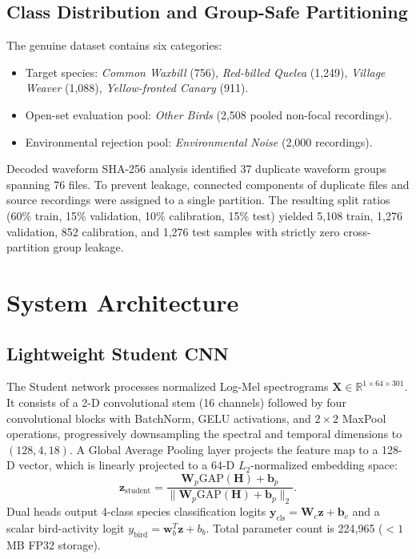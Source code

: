 \documentclass[11pt,a4paper]{article}
\begin{document}
\subsection{Class Distribution and Group-Safe Partitioning}
The genuine dataset contains six categories:
\begin{itemize}
    \item Target species: \textit{Common Waxbill} (756), \textit{Red-billed Quelea} (1,249), \textit{Village Weaver} (1,088), \textit{Yellow-fronted Canary} (911).
    \item Open-set evaluation pool: \textit{Other Birds} (2,508 pooled non-focal recordings).
    \item Environmental rejection pool: \textit{Environmental Noise} (2,000 recordings).
\end{itemize}
Decoded waveform SHA-256 analysis identified 37 duplicate waveform groups spanning 76 files. To prevent leakage, connected components of duplicate files and source recordings were assigned to a single partition. The resulting split ratios (60\% train, 15\% validation, 10\% calibration, 15\% test) yielded 5,108 train, 1,276 validation, 852 calibration, and 1,276 test samples with strictly zero cross-partition group leakage.

\section{System Architecture}
\subsection{Lightweight Student CNN}
The Student network processes normalized Log-Mel spectrograms $\mathbf{X} \in \mathbb{R}^{1 \times 64 \times 301}$. It consists of a 2-D convolutional stem (16 channels) followed by four convolutional blocks with BatchNorm, GELU activations, and $2 \times 2$ MaxPool operations, progressively downsampling the spectral and temporal dimensions to $(128, 4, 18)$. A Global Average Pooling layer projects the feature map to a 128-D vector, which is linearly projected to a 64-D $L_2$-normalized embedding space:
\begin{equation}
\mathbf{z}_{\text{student}} = \frac{\mathbf{W}_p \text{GAP}(\mathbf{H}) + \mathbf{b}_p}{\|\mathbf{W}_p \text{GAP}(\mathbf{H}) + \mathbf{b}_p\|_2}.
\end{equation}
Dual heads output 4-class species classification logits $\mathbf{y}_{\text{cls}} = \mathbf{W}_c \mathbf{z} + \mathbf{b}_c$ and a scalar bird-activity logit $y_{\text{bird}} = \mathbf{w}_b^T \mathbf{z} + b_b$. Total parameter count is 224,965 ($<1$\,MB FP32 storage).
\end{document}
